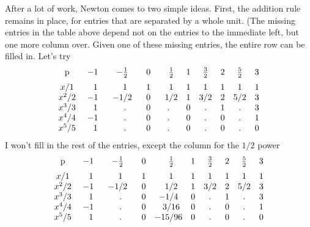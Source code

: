 \documentclass[11pt, oneside]{article}
\begin{document}
After a lot of work, Newton comes to two simple ideas.  First, the addition rule remains in place, for entries that are separated by a whole unit.  (The missing entries in the table above depend not on the entries to the immediate left, but one more column over.  Given one of these missing entries, the entire row can be filled in.  Let's try
\[
\begin{matrix}
\text{p}  \vspace{2 mm} \\
x/1  \\
x^2/2 \\
x^3/3 \\
x^4/4 \\
x^5/5
\end{matrix} \ \ \ \
\begin{matrix}
-1 & -\frac{1}{2} & 0& \ \ \frac{1}{2} & 1& \frac{3}{2}  & 2 & \frac{5}{2}  & 3   \vspace{2 mm}  \\
\ \ 1 & \ \ 1 & 1 & \ \ 1 & 1 & 1 & 1 & 1 & 1 \\
-1 & \ \ -1/2 \ \ & 0 & \ \ 1/2 & 1 & 3/2 & 2 & 5/2 & 3 \\
\ \ 1 & \ \ . & 0 &  . & 0 & . & 1 & . & 3 \\
-1 &  \ \ .  & 0 & . & 0 & . & 0 & . & 1 \\
\ \ 1 &  \ \ . & 0 & . & 0 & . & 0 & . & 0 \\
\end{matrix}
\]
I won't fill in the rest of the entries, except the column for the $1/2$ power
\[
\begin{matrix}
\text{p}  \vspace{2 mm} \\
x/1  \\
x^2/2 \\
x^3/3 \\
x^4/4 \\
x^5/5
\end{matrix} \ \ \ \
\begin{matrix}
-1 & -\frac{1}{2} & 0& \ \ \frac{1}{2} & 1& \frac{3}{2}  & 2 & \frac{5}{2}  & 3   \vspace{2 mm}  \\
\ \ 1 & \ \ 1 & 1 & \ \ 1 & 1 & 1 & 1 & 1 & 1 \\
-1 & \ \ -1/2 \ \ & 0 & \ \ 1/2 & 1 & 3/2 & 2 & 5/2 & 3 \\
\ \ 1 & \ \ . & 0 &  -1/4 & 0 & . & 1 & . & 3 \\
-1 &  \ \ .  & 0 & \ \ 3/16 & 0 & . & 0 & . & 1 \\
\ \ 1 &  \ \ . & 0 & -15/96 & 0 & . & 0 & . & 0 \\
\end{matrix}
\]
\end{document}
